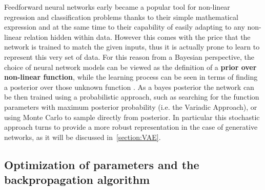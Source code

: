 % 
%
Feedforward neural networks early became a popular tool for non-linear regression and classification problems thanks to their simple mathematical expression and at the same time to their capability of easily adapting to any non-linear relation hidden within data. However this comes with the price that the network is trained to match the given inputs, thus it is actually prone to learn to represent this very set of data.
%
For this reason from a Bayesian perspective, the choice of neural network models can be viewed as the definition of a \textbf{prior over non-linear function}, while the learning process can be seen in terms of finding a posterior over those unknown function \cite{Polson_2017}. 
As a bayes posterior the network can be then trained using a probabilistic approach, such as searching for the function parameters with maximum posterior probability (i.e. the Variadic Approach), or using Monte Carlo to sample directly from posterior. In particular this stochastic approach turns to provide a more robust representation in the case of generative networks, as it will be discussed in~\cref{section:VAE}.
%







\subsection{Optimization of parameters and the backpropagation algorithm}


